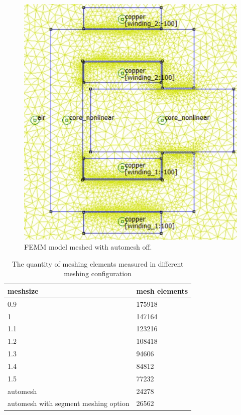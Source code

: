\documentclass[a4paper]{IEEEtran}
\begin{document}
{\begin{figure}[!ht]
\begin{centering}
\includegraphics[scale=0.5]{nonautomeshing.jpg} 
\par\end{centering}   
\caption{FEMM model meshed with automesh off.\label{nonautomesh}}
\end{figure}

\begin{table}[H]
	\centering
	\begin{tabular}{|p{4.5cm}p{2cm}|} 
	\hline
	meshsize & mesh elements \\
	\hline
	\hline
	0.9 & 	175918 \\
	\hline
	1 	& 	147164 \\
	\hline
	1.1	&	123216 \\
	\hline
	1.2	&	108418 \\
	\hline
	1.3 & 	94606  \\
	\hline
	1.4 & 	84812  \\
	\hline
	1.5 & 	77232  \\
	\hline
	automesh & 24278 \\
	\hline
	automesh with segment meshing option & 26562 \\
	\hline
	\end{tabular}
	\caption{The quantity of meshing elements measured in different meshing configuration}
	\label{table:2}
\end{table}


}
\end{document}
